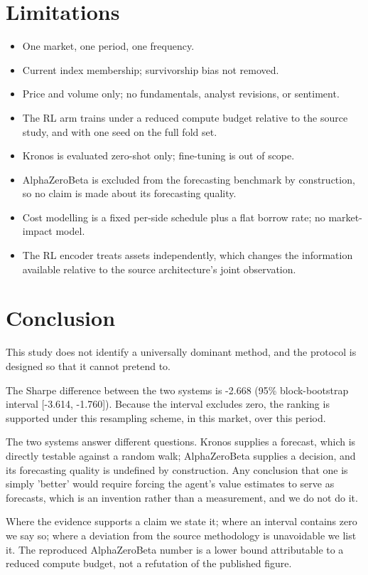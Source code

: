 \documentclass[conference]{IEEEtran}
\begin{document}
\section{Limitations}
\label{sec:limits}
\begin{itemize}
\item One market, one period, one frequency.
\item Current index membership; survivorship bias not removed.
\item Price and volume only; no fundamentals, analyst revisions, or sentiment.
\item The RL arm trains under a reduced compute budget relative to the source
study, and with one seed on the full fold set.
\item Kronos is evaluated zero-shot only; fine-tuning is out of scope.
\item AlphaZeroBeta is excluded from the forecasting benchmark by construction,
so no claim is made about its forecasting quality.
\item Cost modelling is a fixed per-side schedule plus a flat borrow rate; no
market-impact model.
\item The RL encoder treats assets independently, which changes the information
available relative to the source architecture's joint observation.
\end{itemize}

\section{Conclusion}
\label{sec:conclusion}
This study does not identify a universally dominant method, and the protocol is designed so that it cannot pretend to.

The Sharpe difference between the two systems is -2.668 (95\% block-bootstrap interval [-3.614, -1.760]). Because the interval excludes zero, the ranking is supported under this resampling scheme, in this market, over this period.

The two systems answer different questions. Kronos supplies a forecast, which is directly testable against a random walk; AlphaZeroBeta supplies a decision, and its forecasting quality is undefined by construction. Any conclusion that one is simply 'better' would require forcing the agent's value estimates to serve as forecasts, which is an invention rather than a measurement, and we do not do it.

Where the evidence supports a claim we state it; where an interval contains zero we say so; where a deviation from the source methodology is unavoidable we list it. The reproduced AlphaZeroBeta number is a lower bound attributable to a reduced compute budget, not a refutation of the published figure.
\end{document}
